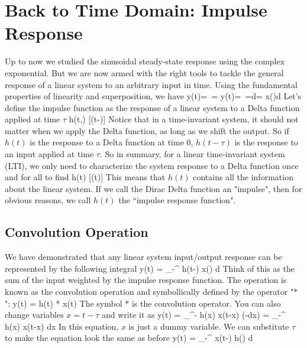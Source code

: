 

\section{Back to Time Domain:  Impulse Response}

Up to now we studied the sinusoidal steady-state response using the complex exponential.  But we are now armed with the right tools to tackle the general response of a linear system to an arbitrary input in time.  Using the fundamental properties of linearity and superposition, we have
\be 
	y\left(t\right)=\ =
\ee
\be
	y\left(t\right)=\ =\int {}d\tau= \int x\left(\tau\right)d\tau
\ee
Let's define the impulse function as the response of a linear system to a Delta function applied at time $\tau$
\be
	h(t,\tau) \equiv  {}[\delta(t-\tau)]
\ee
Notice that in a time-invariant system, it should not matter when we apply the Delta function, as long as we shift the output.  So if $h(t)$ is the response to a Delta function at time 0, $h(t-\tau)$ is the response to an input applied at time $\tau$.  So in summary, for a linear time-invariant system (LTI), we only need to characterize the system response to a Delta function once and for all to find
\be
	h(t) \equiv  {}[\delta(t)]
\ee
This means that $h(t)$ contains all the information about the linear system. If we call the Dirac Delta function an "impulse", then for obvious reasons, we call $h(t)$ the ``impulse response function". 
 



\subsection{Convolution Operation}


We have demonstrated that any linear system input/output response can be represented by the following integral
\be 
	y(t) = \int_{-\infty}^{\infty} h(t-\tau) x(\tau) d\tau 
\ee
Think of this as the sum of the input weighted by the impulse response function.  The operation is known as the convolution operation and symbollically defined by the operator "$*$":  
\be
	y(t) = h(t) * x(t)
\ee
 The symbol $*$ is the convolution operator. You can also change variables $x = t - \tau$ and write it as
\be 
	y(t) = \int_{\infty}^{-\infty} h(x) x(t-x) (-dx) = \int_{-\infty}^{\infty} h(x) x(t-x) dx 
\ee
In this equation, $x$ is just a dummy variable.  We can substitute $\tau$ to make the equation look the same as before
\be 
	y(t) =  \int_{-\infty}^{\infty} x(t-\tau) h(\tau)  d\tau 
\ee
 

